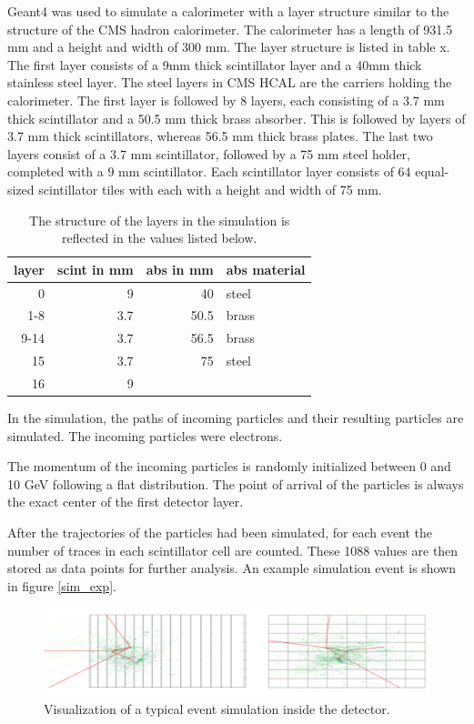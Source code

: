 \documentclass[12pt, a4paper]{thesis}
\begin{document}
Geant4 \cite{geant_simul_toolk} was used to simulate a calorimeter with a layer
structure similar to the structure of the CMS hadron calorimeter. The
calorimeter has a length of 931.5 mm and a height and width of 300 mm. The layer
structure is listed in table x. The first layer consists of a 9mm thick
scintillator layer and a 40mm thick stainless steel layer. The steel layers in
CMS HCAL are the carriers holding the calorimeter. The first layer is followed
by 8 layers, each consisting of a 3.7 mm thick scintillator and a 50.5 mm thick
brass absorber. This is followed by layers of 3.7 mm thick scintillators, whereas
56.5 mm thick brass plates.  The last two layers consist of a 3.7 mm
scintillator, followed by a 75 mm steel holder, completed with a 9 mm
scintillator. Each scintillator layer consists of 64 equal-sized scintillator
tiles with each with a height and width of 75 mm.

\begin{table}[htbp]
\caption{\label{tab:org9d1e87f}
The structure of the layers in the simulation is reflected in the values listed below.}
\centering
\begin{tabular}{rrrl}
layer & scint in mm & abs in mm & abs material\\
\hline
0 & 9 & 40 & steel\\
1-8 & 3.7 & 50.5 & brass\\
9-14 & 3.7 & 56.5 & brass\\
15 & 3.7 & 75 & steel\\
16 & 9 &  & \\
\end{tabular}
\end{table}

In the simulation, the paths of incoming particles and their resulting particles
are simulated. The incoming particles were electrons.

The momentum of the incoming particles is randomly initialized between 0 and 10
GeV following a flat distribution. The point of arrival of the particles is
always the exact center of the first detector layer.

After the trajectories of the particles had been simulated, for each
event the number of traces in each scintillator cell are counted.
These 1088 values are then stored as data points for further
analysis. An example simulation event is shown in figure \ref{sim_exp}.

\begin{figure}[htbp]
\centering
\includegraphics[width=0.9 \textwidth]{../images/front-side.pdf}
\caption{\label{fig:org016a735}
Visualization of a typical  event simulation inside the detector.}
\end{figure}
\end{document}
